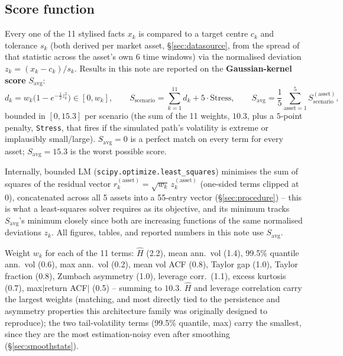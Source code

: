 \documentclass[11pt]{article}
\begin{document}
\subsection{Score function}
\label{sec:score}
Every one of the 11 stylised facts $x_k$ is compared to a target centre $c_k$ and
tolerance $s_k$ (both derived per market asset, \S\ref{sec:datasource}, from the
spread of that statistic across the asset's own 6 time windows) via the normalised
deviation $z_k=(x_k-c_k)/s_k$. Results in this note are reported on the
\textbf{Gaussian-kernel score} $S_{\text{avg}}$:
\[
d_k = w_k\big(1-e^{-\tfrac12 z_k^2}\big) \in [0,w_k],\qquad
S_{\text{scenario}} = \sum_{k=1}^{11} d_k + 5\cdot\text{Stress},\qquad
S_{\text{avg}} = \frac15\sum_{\text{asset}=1}^{5} S_{\text{scenario}}^{(\text{asset})},
\]
bounded in $[0,15.3]$ per scenario (the sum of the 11 weights, $10.3$, plus a $5$-point
penalty, \texttt{Stress}, that fires if the simulated path's volatility is extreme or
implausibly small/large). $S_{\text{avg}}=0$ is a perfect match on every term for every
asset; $S_{\text{avg}}=15.3$ is the worst possible score.

Internally, bounded LM (\texttt{scipy.optimize.least\_squares}) minimises the sum of
squares of the residual vector $r_k^{(\text{asset})}=\sqrt{w_k}\,z_k^{(\text{asset})}$
(one-sided terms clipped at 0), concatenated across all 5 assets into a 55-entry
vector (\S\ref{sec:procedure}) -- this is what a least-squares solver requires as its
objective, and its minimum tracks $S_{\text{avg}}$'s minimum closely since both are
increasing functions of the same normalised deviations $z_k$. All figures, tables, and
reported numbers in this note use $S_{\text{avg}}$.

Weight $w_k$ for each of the 11 terms: $\hat H$ (2.2), mean ann.\ vol (1.4), 99.5\%
quantile ann.\ vol (0.6), max ann.\ vol (0.2), mean vol ACF (0.8), Taylor gap (1.0),
Taylor fraction (0.8), Zumbach asymmetry (1.0), leverage corr.\ (1.1), excess kurtosis
(0.7), max$|$return ACF$|$ (0.5) -- summing to $10.3$. $\hat H$ and leverage correlation
carry the largest weights (matching, and most directly tied to the persistence and
asymmetry properties this architecture family was originally designed to reproduce);
the two tail-volatility terms (99.5\% quantile, max) carry the smallest, since they are
the most estimation-noisy even after smoothing (\S\ref{sec:smoothstats}).
\end{document}
